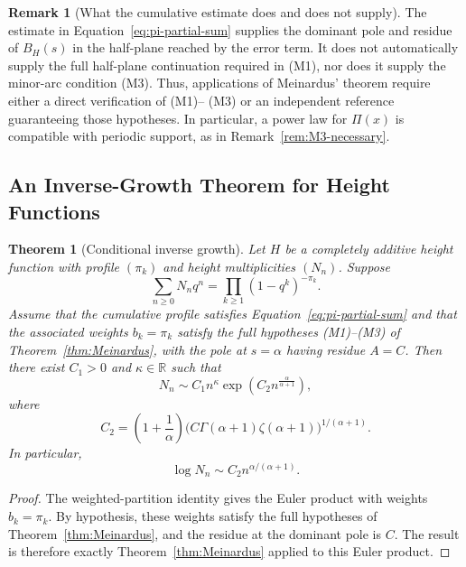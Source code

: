 \documentclass[11pt]{article}
\newtheorem{theorem}{Theorem}
\theoremstyle{definition}
\newtheorem{remark}{Remark}
\begin{document}
\begin{remark}[What the cumulative estimate does and does not supply]
\label{rem:cumulative-not-full-meinardus}
The estimate in Equation~\eqref{eq:pi-partial-sum} supplies the dominant pole and residue of
$B_H(s)$ in the half-plane reached by the error term.  It does not automatically
supply the full half-plane continuation required in \textup{(M1)}, nor does it
supply the minor-arc condition \textup{(M3)}.  Thus, applications of
Meinardus' theorem require either a direct verification of \textup{(M1)}--
\textup{(M3)} or an independent reference guaranteeing those hypotheses.  In
particular, a power law for $\Pi(x)$ is compatible with periodic support, as in
Remark~\ref{rem:M3-necessary}.
\end{remark}

\subsection{An Inverse-Growth Theorem for Height Functions}

\begin{theorem}[Conditional inverse growth]
\label{thm:inverse-growth}
Let $H$ be a completely additive height function with profile $(\pi_k)$ and
height multiplicities $(N_n)$.  Suppose
\[
  \sum_{n\ge0}N_nq^n=\prod_{k\ge1}(1-q^k)^{-\pi_k}.
\]
Assume that the cumulative profile satisfies Equation~\eqref{eq:pi-partial-sum} and that
the associated weights $b_k=\pi_k$ satisfy the full hypotheses
\textup{(M1)}--\textup{(M3)} of Theorem~\ref{thm:Meinardus}, with the pole at
$s=\alpha$ having residue $A=C$.  Then there exist $C_1>0$ and
$\kappa\in\mathbb R$ such that
\[
  N_n\sim C_1n^\kappa
  \exp\!\left(C_2n^{\frac{\alpha}{\alpha+1}}\right),
\]
where
\begin{equation*}
  C_2=
  \left(1+\frac1\alpha\right)
  \bigl(C\Gamma(\alpha+1)\zeta(\alpha+1)\bigr)^{1/(\alpha+1)}.
\end{equation*}
In particular,
\[
  \log N_n\sim C_2n^{\alpha/(\alpha+1)}.
\]
\end{theorem}

\begin{proof}
The weighted-partition identity gives the Euler product with weights
$b_k=\pi_k$.  By hypothesis, these weights satisfy the full hypotheses of
Theorem~\ref{thm:Meinardus}, and the residue at the dominant pole is $C$.
The result is therefore exactly Theorem~\ref{thm:Meinardus} applied to this
Euler product.
\end{proof}
\end{document}
